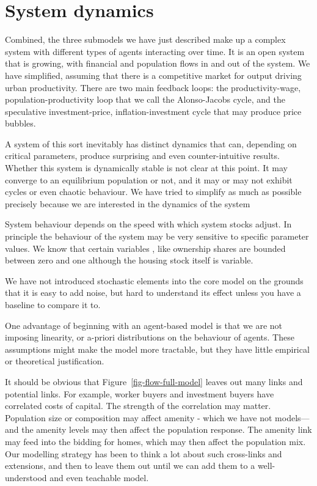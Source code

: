 {\color{red}


\section{System dynamics}\label{sec_model_dynamics}
Combined, the three submodels we have just described make up a complex system with different types of agents interacting over time. It is an \gls{open system} that is growing, with financial and population flows in and out of the system. We have simplified, assuming that there is a competitive market for output driving urban productivity. There are two main \glspl{feedback loop}: the productivity-wage, population-productivity loop that we call the Alonso-Jacobs cycle, and the speculative investment-price, inflation-investment cycle that may produce price bubbles. 

A system of this sort inevitably has distinct dynamics that can, depending on \glspl{critical parameter}, produce surprising and even counter-intuitive results.  Whether this system is dynamically stable is not clear at this point. It may converge to an equilibrium population or not, and it may or may not exhibit cycles or even chaotic behaviour. We have tried to simplify as much as possible precisely because we are interested in the dynamics of the system

System behaviour depends on the speed with which system stocks adjust. In principle the behaviour of the system may be very sensitive to specific parameter values. We know that certain variables , like ownership  shares are bounded between zero and one although the housing stock itself is variable.  

We have not introduced  stochastic elements into the core model on the grounds that it is easy to add noise, but hard to understand its effect unless you have a baseline to  compare it to.

One advantage of beginning with an agent-based model is that we are not imposing linearity, or a-priori distributions on the behaviour of agents. These assumptions might make the model more tractable, but they have little empirical or theoretical justification.

It should be obvious that Figure~\ref{fig-flow-full-model} leaves out many links and potential links. For example, worker buyers and investment buyers have correlated costs of capital. The strength of the correlation may matter. Population size or composition may affect amenity - which we have not models---and the amenity levels may then affect the population response. The amenity link may feed into the bidding for homes, which may then affect the population mix. Our modelling strategy has been to think a lot about such cross-links and extensions, and then to leave them out until we can add them to a well-understood and even teachable model.
}

